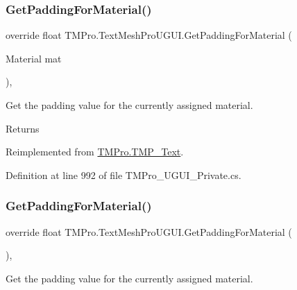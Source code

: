 \subsubsection{\texorpdfstring{GetPaddingForMaterial()}{GetPaddingForMaterial()}\hspace{0.1cm}{\footnotesize\ttfamily [1/2]}}
{\footnotesize\ttfamily override float T\+M\+Pro.\+Text\+Mesh\+Pro\+U\+G\+U\+I.\+Get\+Padding\+For\+Material (\begin{DoxyParamCaption}\item[{Material}]{mat }\end{DoxyParamCaption})\hspace{0.3cm}{\ttfamily [protected]}, {\ttfamily [virtual]}}



Get the padding value for the currently assigned material. 

\begin{DoxyReturn}{Returns}

\end{DoxyReturn}


Reimplemented from \mbox{\hyperlink{class_t_m_pro_1_1_t_m_p___text_a1c51fe580e2440116d1de1280b9d189f}{T\+M\+Pro.\+T\+M\+P\+\_\+\+Text}}.



Definition at line 992 of file T\+M\+Pro\+\_\+\+U\+G\+U\+I\+\_\+\+Private.\+cs.

\mbox{\label{class_t_m_pro_1_1_text_mesh_pro_u_g_u_i_ae9871315cb95b1211de6c61f7500947b}} 
\subsubsection{\texorpdfstring{GetPaddingForMaterial()}{GetPaddingForMaterial()}\hspace{0.1cm}{\footnotesize\ttfamily [2/2]}}
{\footnotesize\ttfamily override float T\+M\+Pro.\+Text\+Mesh\+Pro\+U\+G\+U\+I.\+Get\+Padding\+For\+Material (\begin{DoxyParamCaption}{ }\end{DoxyParamCaption})\hspace{0.3cm}{\ttfamily [protected]}, {\ttfamily [virtual]}}



Get the padding value for the currently assigned material. 

